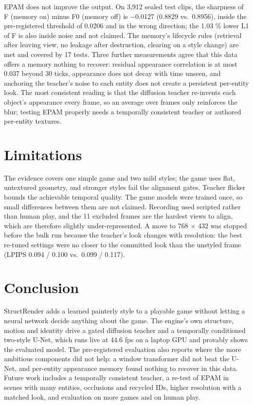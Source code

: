 \documentclass[conference]{IEEEtran}
\begin{document}
EPAM does not improve the output. On 3,912 sealed test clips, the sharpness of F (memory on) minus F0 (memory off) is −0.0127 (0.8829 vs.\ 0.8956), inside the pre-registered threshold of 0.0206 and in the wrong direction; the 1.03 \% lower L1 of F is also inside noise and not claimed. The memory's lifecycle rules (retrieval after leaving view, no leakage after destruction, clearing on a style change) are met and covered by 17 tests. Three further measurements agree that this data offers a memory nothing to recover: residual appearance correlation is at most 0.037 beyond 30 ticks, appearance does not decay with time unseen, and anchoring the teacher's noise to each entity does not create a persistent per-entity look. The most consistent reading is that the diffusion teacher re-invents each object's appearance every frame, so an average over frames only reinforces the blur; testing EPAM properly needs a temporally consistent teacher or authored per-entity textures.

\section{Limitations}\label{sec:limits}

The evidence covers one simple game and two mild styles; the game uses flat, untextured geometry, and stronger styles fail the alignment gates. Teacher flicker bounds the achievable temporal quality. The game models were trained once, so small differences between them are not claimed. Recording used scripted rather than human play, and the 11 excluded frames are the hardest views to align, which are therefore slightly under-represented. A move to 768 × 432 was stopped before the bulk run because the teacher's look changes with resolution: the best re-tuned settings were no closer to the committed look than the unstyled frame (LPIPS 0.094 / 0.100 vs.\ 0.099 / 0.117).

\section{Conclusion}\label{sec:conclusion}

StructRender adds a learned painterly style to a playable game without letting a neural network decide anything about the game. The engine's own structure, motion and identity drive a gated diffusion teacher and a temporally conditioned two-style U-Net, which runs live at 44.6 fps on a laptop GPU and provably shows the evaluated model. The pre-registered evaluation also reports where the more ambitious components did not help: a window transformer did not beat the U-Net, and per-entity appearance memory found nothing to recover in this data. Future work includes a temporally consistent teacher, a re-test of EPAM in scenes with many entities, occlusions and recycled IDs, higher resolution with a matched look, and evaluation on more games and on human play.
\end{document}
